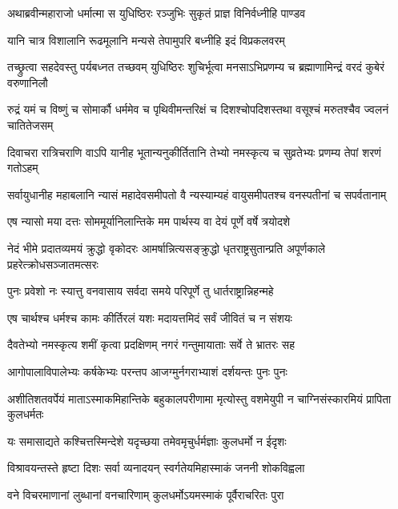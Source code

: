 \twolineshloka
{अथाब्रवीन्महाराजो धर्मात्मा स युधिष्ठिरः}
{रञ्जुभिः सुकृतं प्राज्ञ विनिर्वध्नीहि पाण्डव}


\twolineshloka
{यानि चात्र विशालानि रूढमूलानि मन्यसे}
{तेपामुपरि बध्नीहि इदं विप्रकलवरम्}



\onelineshloka
{तच्छ्रुत्वा सहदेवस्तु पर्यबध्नत तच्छवम्}
\twolineshloka
{युधिष्ठिरः शुचिर्भूत्वा मनसाऽभिप्रणम्य च}
{ब्रह्माणामिन्द्रं वरदं कुबेरं वरुणानिलौ}


\threelineshloka
{रुद्रं यमं च विष्णुं च सोमार्कौ धर्ममेव च}
{पृथिवीमन्तरिक्षं च दिशश्चोपदिशस्तथा}
{वसूश्चं मरुतश्चैव ज्वलनं चातितेजसम्}


\fourlineindentedshloka
{दिवाचरा रात्रिचराणि वाऽपि}
{यानीह भूतान्यनुकीर्तितानि}
{तेभ्यो नमस्कृत्य च सुव्रतेभ्यः}
{प्रणम्य तेपां शरणं गतोऽहम्}


\fourlineindentedshloka
{सर्वायुधानीह महाबलानि}
{न्यासं महादेवसमीपतो वै}
{न्यस्याम्यहं वायुसमीपतश्च}
{वनस्पतीनां च सपर्वतानाम्}


\twolineshloka
{एष न्यासो मया दत्तः सोममूर्यानिलान्तिके}
{मम पार्थस्य वा देयं पूर्णे वर्षे त्रयोदशे}


\threelineshloka
{नेदं भीमे प्रदातव्यमयं क्रुद्धो वृकोदरः}
{आमर्षान्नित्यसङ्क्रुद्धो धृतराष्ट्रसुतान्प्रति}
{अपूर्णकाले प्रहरेत्क्रोधसञ्जातमत्सरः}


\twolineshloka
{पुनः प्रवेशो नः स्यात्तु वनवासाय सर्वदा}
{समये परिपूर्णे तु धार्तराष्ट्रान्निहन्महे}


\twolineshloka
{एष चार्थश्च धर्मश्च कामः कीर्तिरलं यशः}
{मदायत्तमिदं सर्वं जीवितं च न संशयः}



\twolineshloka
{दैवतेभ्यो नमस्कृत्य शमीं कृत्वा प्रदक्षिणम्}
{नगरं गन्तुमायाताः सर्वे ते भ्रातरः सह}


\twolineshloka
{आगोपालाविपालेभ्यः कर्षकेभ्यः परन्तप}
{आजग्मुर्नगराभ्याशं दर्शयन्तः पुनः पुनः}


\threelineshloka
{अशीतिशतवर्पेयं माताऽस्माकमिहान्तिके}
{बहुकालपरीणामा मृत्योस्तु वशमेयुपी}
{न चाग्निसंस्कारमियं प्रापिता कुलधर्मतः}


\twolineshloka
{यः समासाद्यते कश्चित्तस्मिन्देशे यदृच्छया}
{तमेवमृचुर्धर्मज्ञाः कुलधर्मो न ईदृशः}


\twolineshloka
{विश्रावयन्तस्ते हृष्टा दिशः सर्वा व्यनादयन्}
{स्वर्गतेयमिहास्माकं जननी शोकविह्वला}


\twolineshloka
{वने विचरमाणानां लुब्धानां वनचारिणाम्}
{कुलधर्मोऽयमस्माकं पूर्वैराचरितः पुरा}


